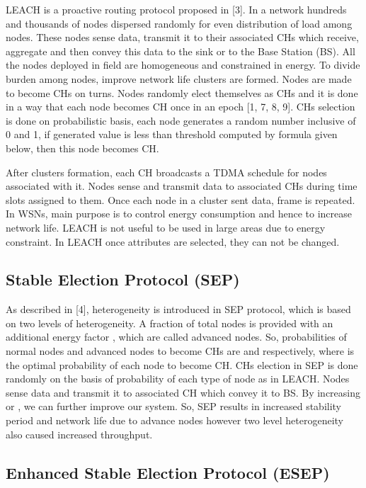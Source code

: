 \documentclass[conference]{IEEEtran}
\begin{document}
 LEACH is a proactive routing protocol proposed in [3]. In a network hundreds and thousands of nodes dispersed randomly for even distribution of load among nodes. These nodes sense data, transmit it to their associated CHs which receive, aggregate and then convey this data to the sink or to the Base Station (BS). All the nodes deployed in field are homogeneous and constrained in energy. To divide burden among nodes, improve network life clusters are formed. Nodes are made to become CHs on turns. Nodes randomly elect themselves as CHs and it is done in a way that each node becomes CH once in an epoch  [1, 7, 8, 9]. CHs selection is done on probabilistic basis, each node generates a random number  inclusive of 0 and 1, if generated value is less than threshold computed by formula given below, then this node becomes CH.



 After clusters formation, each CH broadcasts a TDMA schedule for nodes associated with it. Nodes sense and transmit data to associated CHs during time slots assigned to them. Once each node in a cluster sent data, frame is repeated. In WSNs, main purpose is to control energy consumption and hence to increase network life. LEACH is not useful to be used in large areas due to energy constraint. In LEACH once attributes are selected, they can not be changed.

\subsection{Stable Election Protocol (SEP)}

As described in [4], heterogeneity is introduced in SEP protocol, which is based on two levels of heterogeneity. A fraction  of total  nodes is provided with an additional energy factor , which are called advanced nodes. So, probabilities of normal nodes and advanced nodes to become CHs are  and  respectively, where  is the optimal probability of each node to become CH. CHs election in SEP is done randomly on the basis of probability of each type of node as in LEACH. Nodes sense data and transmit it to associated CH which convey it to BS. By increasing  or , we can further improve our system. So, SEP results in increased stability period and network life due to advance nodes however two level heterogeneity also caused increased throughput.

\subsection{Enhanced Stable Election Protocol (ESEP)}
\end{document}
